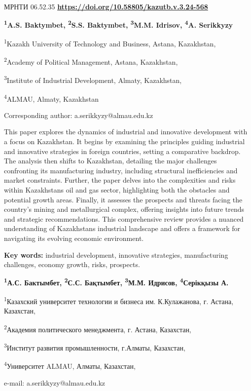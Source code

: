 \newpage
МРНТИ 06.52.35
\hfill {\bfseries \href{https://doi.org/10.58805/kazutb.v.3.24-568}{https://doi.org/10.58805/kazutb.v.3.24-568}}


\begin{center}
{\bfseries \textsuperscript{1}A.S. Baktymbet, \textsuperscript{2}S.S.
Baktymbet, \textsuperscript{3}M.M. Idrisov, \textsuperscript{4}A.
Serikkyzy\envelope}

\textsuperscript{1}Kazakh University of Technology and Business, Astana,
Kazakhstan,

\textsuperscript{2}Academy of Political Management, Astana, Kazakhstan,

\textsuperscript{3}Institute of Industrial Development, Almaty,
Kazakhstan,

\textsuperscript{4}ALMAU, Almaty, Kazakhstan
\end{center}

\envelope Corresponding author:
a.serikkyzy@almau.edu.kz

This paper explores the dynamics of industrial and innovative
development with a focus on Kazakhstan. It begins by examining the
principles guiding industrial and innovative strategies in foreign
countries, setting a comparative backdrop. The analysis then shifts to
Kazakhstan, detailing the major challenges confronting its manufacturing
industry, including structural inefficiencies and market constraints.
Further, the paper delves into the complexities and risks within
Kazakhstan\textquotesingle s oil and gas sector, highlighting both the
obstacles and potential growth areas. Finally, it assesses the prospects
and threats facing the country's mining and metallurgical complex,
offering insights into future trends and strategic recommendations. This
comprehensive review provides a nuanced understanding of
Kazakhstan\textquotesingle s industrial landscape and offers a framework
for navigating its evolving economic environment.

{\bfseries Key words:} industrial development, innovative strategies,
manufacturing challenges, economy growth, risks, prospects.


\begin{center}
{\bfseries \textsuperscript{1}А.С. Бактымбет, \textsuperscript{2}С.С.
Бақтымбет, \textsuperscript{3}М.М. Идрисов, \textsuperscript{4}Серікқызы
А.\envelope}

\textsuperscript{1}Казахский университет технологии и бизнеса им.
К.Кулажанова, г. Астана, Казахстан,

\textsuperscript{2}Академия политического менеджмента, г. Астана,
Казахстан,

\textsuperscript{3}Институт развития промышленности, г.Алматы,
Казахстан,

\textsuperscript{4}Университет ALMAU, Алматы, Казахстан,

e-mail: a.serikkyzy@almau.edu.kz
\end{center}

